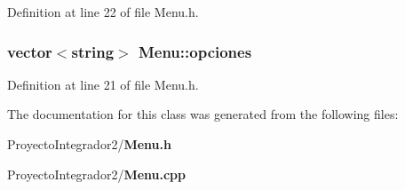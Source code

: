 Definition at line 22 of file Menu.\-h.

\subsubsection[{opciones}]{\setlength{\rightskip}{0pt plus 5cm}vector$<$string$>$ Menu\-::opciones\hspace{0.3cm}{\ttfamily [private]}}\label{class_menu_ab0be6758428c7115eca65679112f1d65}


Definition at line 21 of file Menu.\-h.



The documentation for this class was generated from the following files\-:\begin{DoxyCompactItemize}
\item 
Proyecto\-Integrador2/{\bf Menu.\-h}\item 
Proyecto\-Integrador2/{\bf Menu.\-cpp}\end{DoxyCompactItemize}
